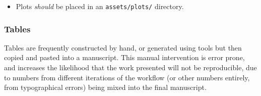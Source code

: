 \documentclass{article}
\newcommand\rfcword[1]{\emph{#1}\xspace}
\newcommand\should{\rfcword{should}}
\newcommand\filename[1]{\texttt{#1}\xspace}
\begin{document}
\begin{itemize}
        it should also generate a file \filename{spectrum\_beta2.3\_figure.tex},
        containing something along the lines of
\begin{verbatim}
\begin{figure}
  \texttt{[image: assets/plots/spectrum\_beta2.3]}
  \caption{\label{fig:spectrum-betatwopointthree}
  The spectrum of the theory at $\beta=2.3''}
\end{figure}
\end{verbatim}
        In this instance,
        the figure \should be included in the manuscript using
\begin{verbatim}

\end{verbatim}
  \item
        Plots \should be placed in an \filename{assets/plots/} directory.
\end{itemize}

\subsubsection{Tables}

Tables are frequently constructed by hand,
or generated using tools but then copied and pasted into a manuscript.
This manual intervention is error prone,
and increases the likelihood that the work presented will not be reproducible,
due to numbers from different iterations of the workflow
(or other numbers entirely,
from typographical errors)
being mixed into the final manuscript.
\end{document}
